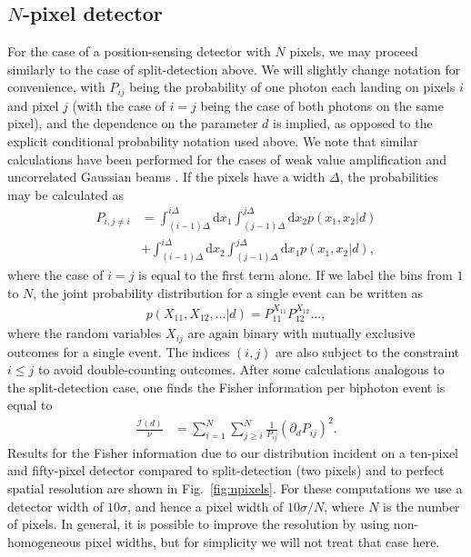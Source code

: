 \subsection{$N$-pixel detector}\label{sub:npixel}
For the case of a position-sensing detector with $N$ pixels, we may proceed similarly to the case of split-detection above.  
We will slightly change notation for convenience, with $P_{ij}$ being the probability of one photon each landing on pixels $i$ and pixel $j$ (with the case of $i=j$ being the case of both photons on the same pixel), and the dependence on the parameter $d$ is implied, as opposed to the explicit conditional probability notation used above.  
We note that similar calculations have been performed for the cases of weak value amplification and uncorrelated Gaussian beams \cite{Knee2014, Knee2015}.
If the pixels have a width $\Delta$, the probabilities may be calculated as 
\begin{align}
	\nonumber	P_{i,j\neq i} &= \int_{(i-1)\Delta}^{i\Delta}\text{d}x_1\int_{(j-1)\Delta}^{j\Delta} \text{d}x_2 p(x_1,x_2|d) \\
	&+ \int_{(i-1)\Delta}^{i\Delta}\text{d}x_2\int_{(j-1)\Delta}^{j\Delta} \text{d}x_1 p(x_1,x_2|d),
\end{align}
where the case of $i=j$ is equal to the first term alone.  
If we label the bins from $1$ to $N$, the joint probability distribution for a single event can be written as
\begin{align}
	p(X_{11},X_{12},...|d) = P_{11}^{X_{11}} P_{12}^{X_{12}}...,
\end{align}
where the random variables $X_{ij}$ are again binary with mutually exclusive outcomes for a single event.  
The indices $(i,j)$ are also subject to the constraint $i \le j$ to avoid double-counting outcomes.  
After some calculations analogous to the split-detection case, one finds the Fisher information per biphoton event is equal to
\begin{align}\label{eq:npixelFisher}
	\frac{\mathcal{I}(d)}{\nu} &= \sum_{i=1}^{N} \sum_{j\ge i}^{N} \frac{1}{P_{ij}}(\partial_d P_{ij})^2.
\end{align}
Results for the Fisher information due to our distribution incident on a ten-pixel and fifty-pixel detector compared to split-detection (two pixels) and to perfect spatial resolution are shown in Fig.~\ref{fig:npixels}. 
For these computations we use a detector width of $10\sigma$, and hence a pixel width of $10\sigma/N$, where $N$ is the number of pixels.
In general, it is possible to improve the resolution by using non-homogeneous pixel widths, but for simplicity we will not treat that case here. 

